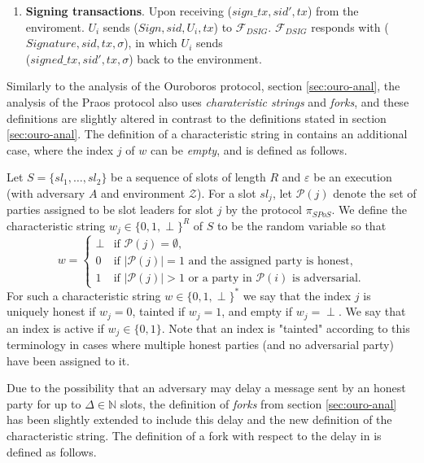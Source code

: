 \begin{enumerate}
\begin{enumerate}
    \end{enumerate}
    \item \textbf{Signing transactions}. Upon receiving ($sign\_tx, sid', tx$) from the enviroment. $U_i$ sends ($Sign, sid, U_i, tx$) to $\mathcal{F}_{DSIG}$. $\mathcal{F}_{DSIG}$ responds with ($Signature, sid, tx, \sigma$), in which $U_i$ sends \\ ($signed\_tx, sid', tx, \sigma$) back to the environment.
\end{enumerate}

Similarly to the analysis of the Ouroboros protocol, section \ref{sec:ouro-anal}, the analysis of the Praos protocol also uses \emph{charateristic strings} and \emph{forks}, and these definitions are slightly altered in contrast to the definitions stated in section \ref{sec:ouro-anal}. The definition of a characteristic string in \cite{ouroboros-praos} contains an additional case, where the index $j$ of $w$ can be \emph{empty}, and is defined as follows.

\begin{mydef}
Let $S = \{sl_1, \ldots, sl_2\}$ be a sequence of slots of length $R$ and $\varepsilon$ be an execution (with adversary $A$ and environment $\mathcal{Z}$). For a slot $sl_j$, let $\mathcal{P}(j)$ denote the set of parties assigned to be slot leaders for slot $j$ by the protocol $\pi_{SPoS}$. We define the characteristic string $w_j \in \{0,1, \perp\}^R$ of $S$ to be the random variable so that
\begin{equation}
    w = \begin{cases}
\perp &\text{if $\mathcal{P}(j) = \emptyset$,}\\
0 &\text{if $|\mathcal{P}(j)|=1$ and the assigned party is honest,}\\
1 &\text{if $|\mathcal{P}(j)|>1$ or a party in $\mathcal{P}(i)$ is adversarial}.
\end{cases}
\end{equation}
For such a characteristic string $w\in \{0,1,\perp\}^{*}$ we say that the index $j$ is uniquely honest if $w_j = 0$, tainted if $w_j = 1$, and empty if $w_j = \perp$. We say that an index is active if $w_j \in \{0,1\}$. Note that an index is "tainted" according to this terminology in cases where multiple honest parties (and no adversarial party) have been assigned to it. 
\end{mydef}

Due to the possibility that an adversary may delay a message sent by an honest party for up to $\Delta \in \mathbb{N}$ slots, the definition of \emph{forks} from section \ref{sec:ouro-anal} has been slightly extended to include this delay and the new definition of the characteristic string. The definition of a fork with respect to the delay in \cite{ouroboros-praos} is defined as follows.

